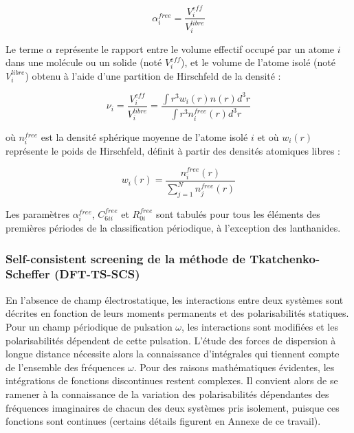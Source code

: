 {	\begin{equation}
	\alpha_{i}^{free} = \frac{V_{i}^{eff}}{V_{i}^{libre}}
	\end{equation}
	
	Le terme $\alpha$ représente le rapport entre le volume effectif occupé par un atome $i$ dans une molécule ou un solide (noté $V_{i}^{eff}$), et le volume de l’atome isolé (noté $V_{i}^{libre}$) obtenu à l’aide d’une partition de Hirschfeld de la densité :
	
	\begin{equation}
	\nu_{i} = \frac{V_{i}^{eff}}{V_{i}^{libre}} = \frac{\int r^{3} w_{i}(r)n(r)d^{3}r}{\int r^{3} n_{i}^{free} (r)d^{3}r}
	\end{equation}
	
	où $n_{i}^{free}$ est la densité sphérique moyenne de l’atome isolé $i$ et où $w_{i}(r)$ représente le poids de Hirschfeld, définit à partir des densités atomiques libres : 
	
	\begin{equation}
	w_{i}(r)= \frac{n_{i}^{free}(r)}{\sum_{j=1}^{N} n_{j}^{free}(r)}
	\end{equation}
	\bigskip
	
	Les paramètres $\alpha_{i}^{free}$, $C_{6ii}^{free}$ et $R_{0i}^{free}$ sont tabulés pour tous les éléments des premières périodes de la classification périodique, à l'exception des lanthanides.
	
	
	\subsubsection{Self-consistent screening de la méthode de Tkatchenko-Scheffer (DFT-TS-SCS)}
	
	En l'absence de champ électrostatique, les interactions entre deux systèmes sont décrites en fonction de leurs moments permanents et des polarisabilités statiques. Pour un champ périodique de pulsation $\omega$, les interactions sont modifiées et les polarisabilités dépendent de cette pulsation. L'étude des forces de dispersion à longue distance nécessite alors la connaissance d'intégrales qui tiennent compte de l'ensemble des fréquences $\omega$. Pour des raisons mathématiques évidentes, les intégrations de fonctions discontinues restent complexes. Il convient alors de se ramener à la connaissance de la variation des polarisabilités dépendantes des fréquences imaginaires de chacun des deux systèmes pris isolement, puisque ces fonctions sont continues (certains détails figurent en Annexe de ce travail). \\
	
}

